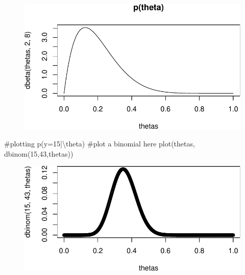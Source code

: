 \documentclass[
  letterpaper,
  DIV=11,
  numbers=noendperiod]{scrartcl}
\newenvironment{Shaded}{\begin{snugshade}}{\end{snugshade}}
\newcommand{\CommentTok}[1]{\textcolor[rgb]{0.37,0.37,0.37}{#1}}
\newcommand{\DecValTok}[1]{\textcolor[rgb]{0.68,0.00,0.00}{#1}}
\newcommand{\FunctionTok}[1]{\textcolor[rgb]{0.28,0.35,0.67}{#1}}
\newcommand{\NormalTok}[1]{\textcolor[rgb]{0.00,0.23,0.31}{#1}}
\begin{document}
\begin{figure}[H]

{\centering \includegraphics{hw2_602_files/figure-pdf/unnamed-chunk-7-1.pdf}

}

\end{figure}

\begin{Shaded}
\begin{Highlighting}[]
\CommentTok{\#plotting p(y=15|\textbackslash{}theta)}
\CommentTok{\#plot a binomial here }
\FunctionTok{plot}\NormalTok{(thetas, }\FunctionTok{dbinom}\NormalTok{(}\DecValTok{15}\NormalTok{,}\DecValTok{43}\NormalTok{,thetas))}
\end{Highlighting}
\end{Shaded}

\begin{figure}[H]

{\centering \includegraphics{hw2_602_files/figure-pdf/unnamed-chunk-7-2.pdf}

}

\end{figure}
\end{document}
